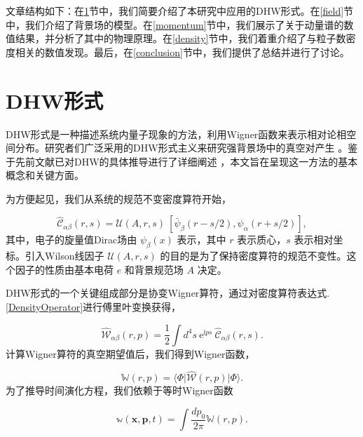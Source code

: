 文章结构如下：在\ref{Dirac-Heisenberg-Wigner formalism}节中，我们简要介绍了本研究中应用的DHW形式。在\ref{field}节中，我们介绍了背景场的模型。在\ref{momentum}节中，我们展示了关于动量谱的数值结果，并分析了其中的物理原理。在\ref{density}节中，我们着重介绍了与粒子数密度相关的数值发现。最后，在\ref{conclusion}节中，我们提供了总结并进行了讨论。

 \section{DHW形式}\label{Dirac-Heisenberg-Wigner formalism}
 DHW形式是一种描述系统内量子现象的方法，利用Wigner函数来表示相对论相空间分布。研究者们广泛采用的DHW形式主义来研究强背景场中的真空对产生 \cite{2020cm,1991B,2010h,2011h,2020ck,2021l,2023cMM,2023O,2023hu}。鉴于先前文献已对DHW的具体推导进行了详细阐述 \cite{2015ck,1987v}，本文旨在呈现这一方法的基本概念和关键方面。
 
 为方便起见，我们从系统的规范不变密度算符开始，

\begin{equation}\label{DensityOperator}
 \hat {\mathcal C}_{\alpha \beta} \left(r , s \right) = \mathcal U \left(A,r,s
\right) \ \left[ \bar \psi_\beta \left( r - s/2 \right), \psi_\alpha \left( r +
s/2 \right) \right],
\end{equation}
其中，电子的旋量值Dirac场由 ${\psi }_{\beta }\left ( {x}\right )$ 表示，其中 $r$ 表示质心，$s$ 表示相对坐标。引入Wilson线因子 $\mathcal{U}(A,r,s) $ 的目的是为了保持密度算符的规范不变性。这个因子的性质由基本电荷 $e$ 和背景规范场 $A$ 决定。

DHW形式的一个关键组成部分是协变Wigner算符，通过对密度算符表达式.\eqref{DensityOperator}进行傅里叶变换获得，

\begin{equation}\label{WignerOperator}
\hat{\mathcal W}_{\alpha \beta} \left( r , p \right) = \frac{1}{2} \int d^4 s \
\mathrm{e}^{\mathrm{i} ps} \  \hat{\mathcal C}_{\alpha \beta} \left( r , s
\right).
\end{equation}
计算Wigner算符的真空期望值后，我们得到Wigner函数，

\begin{equation}\label{Wigner function}
 \mathbb{W} \left( r,p \right) = \langle \Phi \vert \hat{\mathcal W} \left( r,p
\right) \vert \Phi \rangle.
\end{equation}
为了推导时间演化方程，我们依赖于等时Wigner函数

\begin{equation}
\mathbb{w} (\mathbf{x}, \mathbf{p}, t) = \int \frac{d p_{0}}{2 \pi} \mathbb{W}(r, p).
\end{equation}

